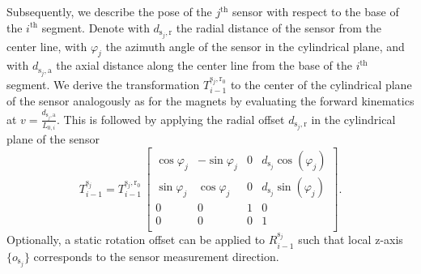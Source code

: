 Subsequently, we  describe the pose of the $j^\mathrm{th}$ sensor with respect to the base of the $i^\mathrm{th}$ segment.
Denote with $d_{\mathrm{s}_j,\mathrm{r}}$ the radial distance of the sensor from the center line, with $\varphi_j$ the azimuth angle of the sensor in the cylindrical plane, and with $d_{\mathrm{s}_j,\mathrm{a}}$ the axial distance along the center line from the base of the $i^\mathrm{th}$ segment.
We derive the transformation $T_{i-1}^{\mathrm{s}_j,\mathrm{r}_0}$ to the center of the cylindrical plane of the sensor %
analogously as for the magnets by evaluating the forward kinematics at $v = \frac{d_{\mathrm{s}_j,\mathrm{a}}}{L_{0,i}}$.
This is followed by applying the radial offset $d_{\mathrm{s}_j,\mathrm{r}}$ in the cylindrical plane of the sensor
\begin{equation}
    T_{i-1}^{\mathrm{s}_j} = T_{i-1}^{\mathrm{s}_j,\mathrm{r}_0}
    \,
    \begin{bmatrix}
        \cos{\varphi_j} & - \sin{\varphi_j} & 0 & d_{\mathrm{s}_j} \cos(\varphi_j)\\
        \sin{\varphi_j} & \cos{\varphi_j} & 0 & d_{\mathrm{s}_j} \sin(\varphi_j)\\
        0 & 0 & 1 & 0\\
        0 & 0 & 0 & 1\\
    \end{bmatrix}.
\end{equation}
Optionally, a static rotation offset can be applied to $R_{i-1}^{\mathrm{s}_j}$ such that local z-axis $\{ o_{\mathrm{s}_j} \}$ corresponds to the sensor measurement direction.

